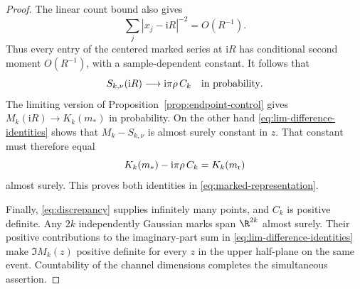 \begin{proof}
The linear count bound also gives
\[
 \sum_j|x_j-\mathrm i R|^{-2}=O(R^{-1}).
\]
Thus every entry of the centered marked series at
\(\mathrm i R\) has conditional second moment \(O(R^{-1})\),
with a sample-dependent constant. It follows that
\[
 S_{k,\nu}(\mathrm i R)
 \longrightarrow \mathrm i\pi\rho\,C_k
 \quad\hbox{in probability}.
\]
The limiting version of Proposition~\ref{prop:endpoint-control}
gives \(M_k(\mathrm i R)\to K_k(m_*)\) in probability. On the
other hand \eqref{eq:lim-difference-identities} shows that
\(M_k-S_{k,\nu}\) is almost surely constant in \(z\).
That constant must therefore equal
\[
 K_k(m_*)-\mathrm i\pi\rho\,C_k=K_k(m_{\rm r})
\]
almost surely. This proves both identities in
\eqref{eq:marked-representation}.

Finally, \eqref{eq:discrepancy} supplies infinitely many points,
and \(C_k\) is positive definite. Any \(2k\) independently
Gaussian marks span \(\R^{2k}\) almost surely. Their positive
contributions to the imaginary-part sum in
\eqref{eq:lim-difference-identities} make \(\Im M_k(z)\) positive
definite for every \(z\) in the upper half-plane on the same
event. Countability of the channel dimensions completes the
simultaneous assertion.
\end{proof}

